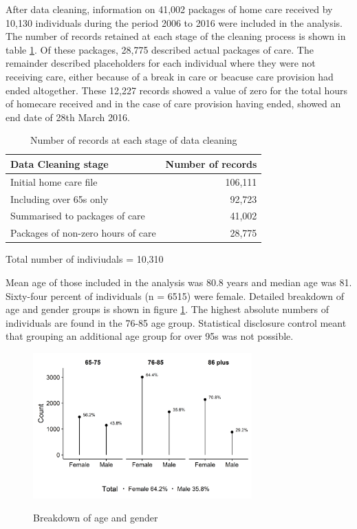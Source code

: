 \documentclass[]{article}
\begin{document}
After data cleaning, information on 41,002 packages of home care
received by 10,130 individuals during the period 2006 to 2016 were
included in the analysis. The number of records retained at each stage
of the cleaning process is shown in table \ref{tab:renf-cleaning}. Of
these packages, 28,775 described actual packages of care. The remainder
described placeholders for each individual where they were not receiving
care, either because of a break in care or beacuse care provision had
ended altogether. These 12,227 records showed a value of zero for the
total hours of homecare received and in the case of care provision
having ended, showed an end date of 28th March 2016.

\begin{table}[h]
\centering
\caption{Number of records at each stage of data cleaning}
\label{tab:renf-cleaning}
\begin{threeparttable}
\begin{tabular}{@{}lr@{}}
\toprule
Data Cleaning stage                & Number of records \\ \midrule
Initial home care file             & 106,111           \\
Including over 65s only            & 92,723             \\
Summarised to packages of care     & 41,002\tnote{1}    \\ 
Packages of non-zero hours of care & 28,775             \\ \bottomrule
\end{tabular}
\begin{tablenotes}
\item[1] Total number of indiviudals = 10,310
\end{tablenotes}
\end{threeparttable}
\end{table}

Mean age of those included in the analysis was 80.8 years and median age
was 81. Sixty-four percent of individuals (n = 6515) were female.
Detailed breakdown of age and gender groups is shown in figure
\ref{fig:ren-age-gen}. The highest absolute numbers of individuals are
found in the 76-85 age group. Statistical disclosure control meant that
grouping an additional age group for over 95s was not possible.

\begin{figure}[h]
  \centering
    \caption{Breakdown of age and gender}
    \includegraphics[width = 0.75\textwidth]{figures/chapter-renf/01-age-gender-ts-subset.png}
    \label{fig:ren-age-gen}
\end{figure}
\end{document}
